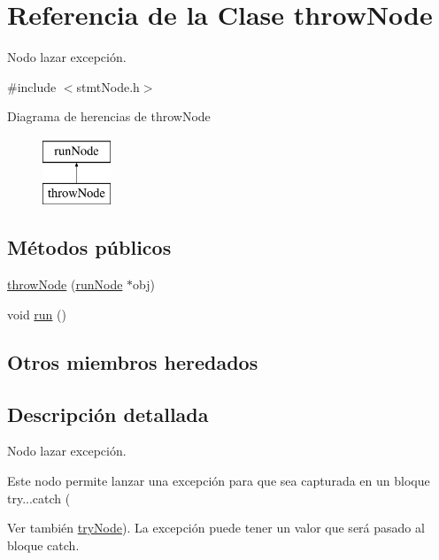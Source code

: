 \hypertarget{classthrowNode}{\section{Referencia de la Clase throw\-Node}
\label{classthrowNode}
}


Nodo lazar excepción.  




{\ttfamily \#include $<$stmt\-Node.\-h$>$}

Diagrama de herencias de throw\-Node\begin{figure}[H]
\begin{center}
\leavevmode
\includegraphics[height=2.000000cm]{classthrowNode}
\end{center}
\end{figure}
\subsection*{Métodos públicos}
\begin{DoxyCompactItemize}
\item 
\hyperlink{classthrowNode_aa10ff7a04056eba1066413f0c0d921fc}{throw\-Node} (\hyperlink{classrunNode}{run\-Node} $\ast$obj)
\item 
void \hyperlink{classthrowNode_a030f2922340a640074d7a291dea86520}{run} ()
\end{DoxyCompactItemize}
\subsection*{Otros miembros heredados}


\subsection{Descripción detallada}
Nodo lazar excepción. 

Este nodo permite lanzar una excepción para que sea capturada en un bloque try...catch (\begin{DoxySeeAlso}{Ver también}
\hyperlink{classtryNode}{try\-Node}). La excepción puede tener un valor que será pasado al bloque catch. 
\end{DoxySeeAlso}


